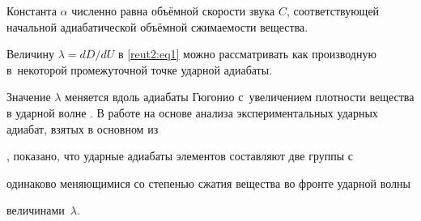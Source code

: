 Константа $\alpha $ численно равна объёмной скорости звука $C$, соответствующей начальной адиабатической объёмной сжимаемости вещества.









Величину $\lambda =dD/dU$ в \eqref{reut2:eq1} можно рассматривать как производную  в~некоторой промежуточной точке ударной адиабаты. 

Значение $\lambda $ меняется вдоль адиабаты Гюгонио с~увеличением плотности вещества в ударной волне \cite{reut2:bib1}. В работе \cite{reut2:bib2} на ос\-нове анализа экспериментальных ударных адиабат, взятых в основном из

\cite{reut2:bib1}, показано, что ударные адиабаты элементов составляют две группы с

одинаково меняющимися со степенью сжатия вещества во фронте ударной волны

величинами~$\lambda $.





